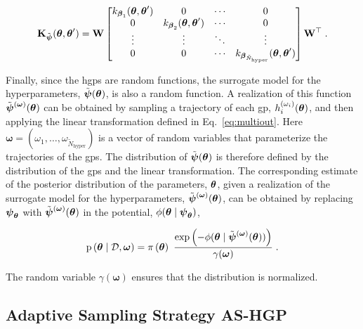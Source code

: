 \begin{equation}
  \mathbf{K}_{\tilde{\boldsymbol{\psi}}}(\boldsymbol{\theta}, \boldsymbol{\theta}') = \mathbf{W} \begin{bmatrix} k_{\boldsymbol{\beta}_1}(\boldsymbol{\theta}, \boldsymbol{\theta}') & 0 & \cdots & 0 \\ 0 & k_{\boldsymbol{\beta}_2}(\boldsymbol{\theta}, \boldsymbol{\theta}') & \cdots & 0 \\ \vdots & \vdots & \ddots & \vdots \\ 0 & 0 & \cdots & k_{\boldsymbol{\beta}_{\tilde{N}_{\mathrm{hyper}}}}(\boldsymbol{\theta}, \boldsymbol{\theta}') \end{bmatrix} \mathbf{W}^{\top} \;.
  \label{eq:multiout_cov}
\end{equation}

\smallskip
Finally, since the \glspl{hgp} are random functions, the surrogate model for the hyperparameters, $\tilde{\boldsymbol{\psi}}(\boldsymbol{\theta})$, is also a random function. A realization of this function $\tilde{\boldsymbol{\psi}}^{(\boldsymbol{\omega})}(\boldsymbol{\theta})$ can be obtained by sampling a trajectory of each \gls{gp}, $h_i^{(\omega_i)}(\boldsymbol{\theta})$, and then applying the linear transformation defined in Eq.~\eqref{eq:multiout}. Here $\boldsymbol{\omega} = (\omega_1, \ldots, \omega_{\tilde{N}_{\mathrm{hyper}}})$ is a vector of random variables that parameterize the trajectories of the \glspl{gp}. The distribution of $\tilde{\boldsymbol{\psi}}(\boldsymbol{\theta})$ is therefore defined by the distribution of the \glspl{gp} and the linear transformation. The corresponding estimate of the posterior distribution of the parameters, $\boldsymbol{\theta}$, given a realization of the surrogate model for the hyperparameters, $\tilde{\boldsymbol{\psi}}^{(\boldsymbol{\omega})}(\boldsymbol{\theta})$, can be obtained by replacing $\boldsymbol{\psi}_{\boldsymbol{\theta}}$ with $\tilde{\boldsymbol{\psi}}^{(\boldsymbol{\omega})}(\boldsymbol{\theta})$ in the potential, $\phi(\boldsymbol{\theta} \mid \boldsymbol{\psi}_{\boldsymbol{\theta}})$,

\begin{equation}
  \mathrm{p} \left( \boldsymbol{\theta} \mid \mathcal{D}, \boldsymbol{\omega} \right) = \pi \left( \boldsymbol{\theta}\right) \ \dfrac{\exp \left(-\phi(\boldsymbol{\theta} \mid \tilde{\boldsymbol{\psi}}^{(\boldsymbol{\omega})}(\boldsymbol{\theta})) \right)}{\gamma(\boldsymbol{\omega})} \;.
  \label{eq:phik}
\end{equation}

The random variable $\gamma(\boldsymbol{\omega})$ ensures that the distribution is normalized.

\subsection{Adaptive Sampling Strategy AS-HGP}
\label{sc:surr:iterative}

